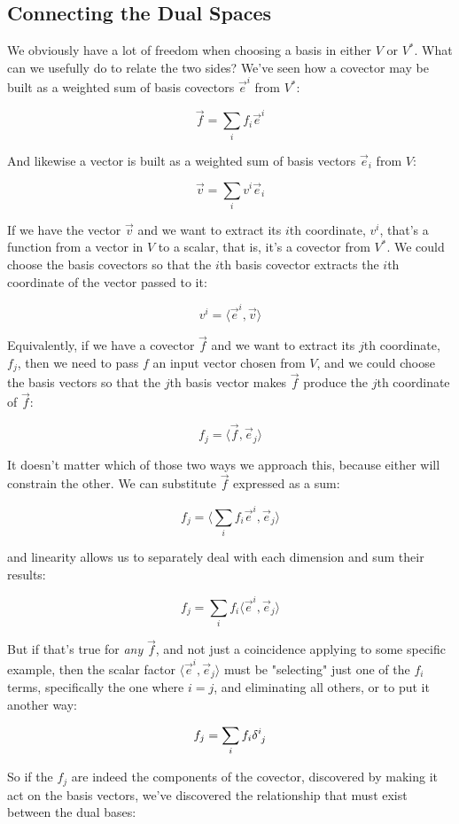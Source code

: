 \subsection{Connecting the Dual Spaces}

We obviously have a lot of freedom when choosing a basis in either $V$ or $V^*$. What can we usefully do to relate the two sides? We've seen how a covector may be built as a weighted sum of basis covectors $\vec{e}^i$ from $V^*$:

$$
\vec{f} = \sum_i f_i \vec{e}^i
$$

And likewise a vector is built as a weighted sum of basis vectors $\vec{e}_i$ from $V$:

$$
\vec{v} = \sum_i v^i \vec{e}_i
$$

If we have the vector $\vec{v}$ and we want to extract its $i$th coordinate, $v^i$, that's a function from a vector in $V$ to a scalar, that is, it's a covector from $V^*$. We could choose the basis covectors so that the $i$th basis covector extracts the $i$th coordinate of the vector passed to it:

$$
v^i = \langle \vec{e}^i , \vec{v} \rangle
$$ 

Equivalently, if we have a covector $\vec{f}$ and we want to extract its $j$th coordinate, $f_j$, then we need to pass $f$ an input vector chosen from $V$, and we could choose the basis vectors so that the $j$th basis vector makes $\vec{f}$ produce the $j$th coordinate of $\vec{f}$:

$$
f_j = \langle \vec{f} , \vec{e}_j\rangle
$$

It doesn't matter which of those two ways we approach this, because either will constrain the other. We can substitute $\vec{f}$ expressed as a sum:

$$
f_j = \langle \sum_i f_i \vec{e}^i , \vec{e}_j\rangle
$$

and linearity allows us to separately deal with each dimension and sum their results:

$$
f_j = \sum_i f_i \langle \vec{e}^i , \vec{e}_j\rangle
$$

But if that's true for \textit{any} $\vec{f}$, and not just a coincidence applying to some specific example, then the scalar factor $\langle \vec{e}^i , \vec{e}_j\rangle$ must be "selecting" just one of the $f_i$ terms, specifically the one where $i = j$, and eliminating all others, or to put it another way:

$$
f_j = \sum_i f_i \delta \indices{^i_j}
$$

So if the $f_j$ are indeed the components of the covector, discovered by making it act on the basis vectors, we've discovered the relationship that must exist between the dual bases:

